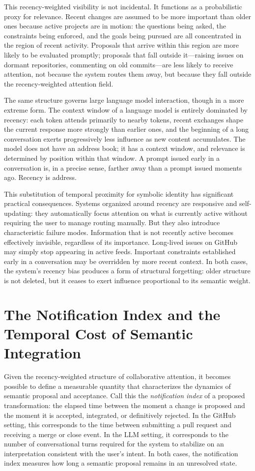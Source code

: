 \documentclass[12pt, letterpaper]{article}
\begin{document}
This recency-weighted visibility is not incidental. It functions as a probabilistic proxy for relevance. Recent changes are assumed to be more important than older ones because active projects are in motion: the questions being asked, the constraints being enforced, and the goals being pursued are all concentrated in the region of recent activity. Proposals that arrive within this region are more likely to be evaluated promptly; proposals that fall outside it---raising issues on dormant repositories, commenting on old commits---are less likely to receive attention, not because the system routes them away, but because they fall outside the recency-weighted attention field.

The same structure governs large language model interaction, though in a more extreme form. The context window of a language model is entirely dominated by recency: each token attends primarily to nearby tokens, recent exchanges shape the current response more strongly than earlier ones, and the beginning of a long conversation exerts progressively less influence as new content accumulates. The model does not have an address book; it has a context window, and relevance is determined by position within that window. A prompt issued early in a conversation is, in a precise sense, farther away than a prompt issued moments ago. Recency is address.

This substitution of temporal proximity for symbolic identity has significant practical consequences. Systems organized around recency are responsive and self-updating: they automatically focus attention on what is currently active without requiring the user to manage routing manually. But they also introduce characteristic failure modes. Information that is not recently active becomes effectively invisible, regardless of its importance. Long-lived issues on GitHub may simply stop appearing in active feeds. Important constraints established early in a conversation may be overridden by more recent context. In both cases, the system's recency bias produces a form of structural forgetting: older structure is not deleted, but it ceases to exert influence proportional to its semantic weight.

\section{The Notification Index and the Temporal Cost of Semantic Integration}

Given the recency-weighted structure of collaborative attention, it becomes possible to define a measurable quantity that characterizes the dynamics of semantic proposal and acceptance. Call this the \emph{notification index} of a proposed transformation: the elapsed time between the moment a change is proposed and the moment it is accepted, integrated, or definitively rejected. In the GitHub setting, this corresponds to the time between submitting a pull request and receiving a merge or close event. In the LLM setting, it corresponds to the number of conversational turns required for the system to stabilize on an interpretation consistent with the user's intent. In both cases, the notification index measures how long a semantic proposal remains in an unresolved state.
\end{document}
